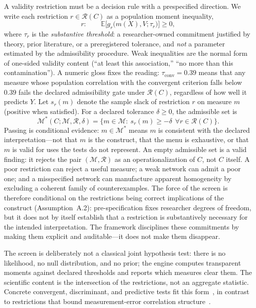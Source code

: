 \documentclass[10pt,letterpaper]{article}
\newcommand{\M}{\ensuremath{\mathcal{M}}}
\newcommand{\E}{\mathbb{E}}
\newcommand{\Rset}{\mathcal{R}}
\begin{document}
A validity restriction must be a decision rule with a prespecified direction.
We write each restriction $r\in\Rset(C)$ as a population moment inequality,
\begin{equation}
r:\qquad \E\bigl[g_r\bigl(m(X),V;\tau_r\bigr)\bigr]\ge 0,
\label{eq:restriction}
\end{equation}
where $\tau_r$ is the \emph{substantive threshold}: a researcher-owned commitment justified by theory, prior literature, or a preregistered tolerance, and \emph{not} a parameter estimated by the admissibility procedure.
Weak inequalities are the normal form of one-sided validity content (``at least this association,'' ``no more than this contamination'').
A numeric gloss fixes the reading: $\tau_{\mathrm{conv}}=0.39$ means that any measure whose population correlation with the convergent criterion falls below $0.39$ fails the declared admissibility gate under $\Rset(C)$, regardless of how well it predicts $Y$.
Let $s_r(m)$ denote the sample slack of restriction $r$ on measure $m$ (positive when satisfied).
For a declared tolerance $\delta\ge 0$, the admissible set is
\begin{equation}
\M^*(C;\M,\Rset,\delta)=\bigl\{m\in\M:\ s_r(m)\ge-\delta\ \ \forall r\in\Rset(C)\bigr\}.
\label{eq:Mstar}
\end{equation}
Passing is conditional evidence: $m\in\M^*$ means $m$ is consistent with the declared interpretation---not that $m$ is the construct, that the menu is exhaustive, or that $m$ is valid for uses the tests do not represent.
An empty admissible set is a valid finding: it rejects the pair $(\M,\Rset)$ as an operationalization of $C$, not $C$ itself.
A poor restriction can reject a useful measure; a weak network can admit a poor one; and a misspecified network can manufacture apparent homogeneity by excluding a coherent family of counterexamples.
The force of the screen is therefore conditional on the restrictions being correct implications of the construct (Assumption~A.2): pre-specification fixes researcher degrees of freedom, but it does not by itself establish that a restriction is substantively necessary for the intended interpretation.
The framework disciplines these commitments by making them explicit and auditable---it does not make them disappear.

The screen is deliberately not a classical joint hypothesis test: there is no likelihood, no null distribution, and no prior; the engine computes transparent moments against declared thresholds and reports which measures clear them.
The scientific content is the intersection of the restrictions, not an aggregate statistic.
Concrete convergent, discriminant, and predictive tests fit this form~\cite{proxy2026,halterman2026}, in contrast to restrictions that bound measurement-error correlation structure~\cite{chenrttamer2026}.
\end{document}
